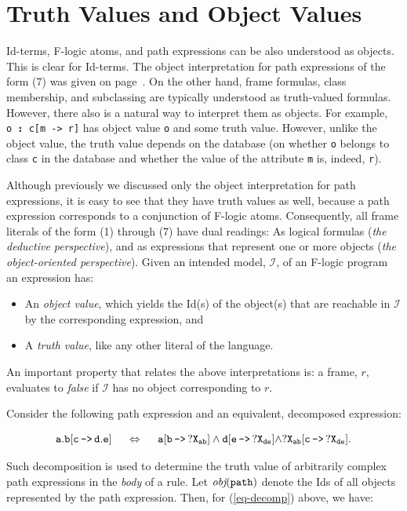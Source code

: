 \documentclass[11pt]{article}
\newcommand{\obj}{\textit{obj}\xspace}
\newcommand{\db}[1]{\ensuremath{\mathcal{#1}}}
\newcommand{\isa}{\,{\bf{:}}\,}
\newcommand{\mvd}{{\mbox{\tt \,->\,}}}  %
\newcommand{\fl}{\mbox{F-logic}\xspace}
\begin{document}
\section{Truth Values and Object Values} \label{sec-references}


Id-terms, \fl atoms, and path expressions can be also understood as
objects. This is clear for Id-terms. The object interpretation for path
expressions of the form (7) was given on page~\pageref{eq-path-fun}.
On the other hand, frame formulas, class membership, and subclassing
are typically understood as truth-valued formulas.
However, there
also is a natural way to interpret them as objects.  For example,
{\tt o{\isa}c[m{\mvd}r]} has object value {\tt o} and some truth value.
However, unlike the object value, the truth value depends on the database
(on whether {\tt o} belongs to class {\tt c} in the database and whether
the value of the attribute {\tt m} is, indeed, {\tt r}).

Although previously we discussed only the object interpretation for path
expressions, it is easy to see that they have truth values as well, because
a path expression corresponds to a conjunction of F-logic atoms.
Consequently, all frame literals of the form (1) through (7) have dual
readings: As logical formulas (\emph{the deductive perspective}), and as
expressions that represent one or more objects (\emph{the object-oriented
  perspective}).  Given an intended model, \db I, of an \fl program an
expression has:
\begin{itemize}
\item An \emph{object value}, which yields the Id(s) of the object(s)
  that are reachable in \db I by the corresponding expression, and 
\item A \emph{truth value}, like any other literal of the
  language. 
\end{itemize}
An important property that relates the above interpretations is: a
frame, $r$, evaluates to \emph{false} if \db I has no object
corresponding to $r$.


Consider the following path expression and an equivalent, decomposed
expression:

\begin{equation}\label{eq-decomp}
\tt
a.b[c\mvd d.e] \quad\ \Leftrightarrow \quad\  a[b\mvd ?X_{ab}]
\land d[e\mvd ?X_{de}] \land ?X_{ab}[c\mvd ?X_{de}]. 
\end{equation}

\noindent
Such decomposition is used to determine the truth value of arbitrarily complex
path expressions in the \emph{body} of a rule.  Let $\tt \obj(path)$ denote
the Ids of all objects represented by the path expression. Then, for
(\ref{eq-decomp}) above, we have:
\end{document}
